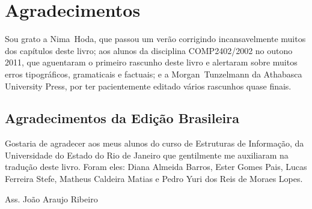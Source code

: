 \chapter*{Agradecimentos}

Sou grato a Nima~Hoda, que passou um verão corrigindo incansavelmente muitos 
dos capítulos deste livro; aos alunos da disciplina COMP2402/2002 no outono 2011, que 
aguentaram o primeiro rascunho deste livro e alertaram sobre muitos erros tipográficos, 
gramaticais e factuais; e a Morgan~Tunzelmann da Athabasca University Press, por ter 
pacientemente editado vários rascunhos quase finais.

\section{Agradecimentos da Edição Brasileira}

Gostaria de agradecer aos meus alunos do curso de Estruturas de Informação, da 
Universidade do Estado do Rio de Janeiro que gentilmente me auxiliaram na tradução
deste livro. Foram eles: Diana Almeida Barros, Ester Gomes Pais, Lucas Ferreira 
Stefe, Matheus Caldeira Matias e Pedro Yuri dos Reis de Moraes Lopes. 

Ass. João Araujo Ribeiro